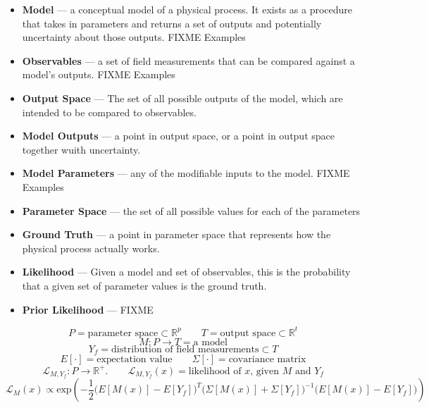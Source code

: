 \documentclass{article}
\begin{document}
\begin{itemize}

\item \textbf{Model} — a conceptual model of a physical process.  It exists as
  a procedure that takes in parameters and returns a set of
  outputs and potentially uncertainty about those outputs. FIXME Examples
 
\item \textbf{Observables} — a set of field measurements that can be compared
  against a model's outputs. FIXME Examples

\item \textbf{Output Space} — The set of all possible outputs of the model,
  which are intended to be compared to observables.

\item \textbf{Model Outputs} — a point in output space, or a point in output
  space together wuith uncertainty.

\item \textbf{Model Parameters} — any of the modifiable inputs to the
  model. FIXME Examples

\item \textbf{Parameter Space} — the set of all possible values for each of the
  parameters

\item \textbf{Ground Truth} — a point in parameter space that represents how
  the physical process actually works.

\item \textbf{Likelihood} — Given a model and set of observables, this is the
  probability that a given set of parameter values is the ground truth.

\item \textbf{Prior Likelihood} — FIXME
\end{itemize}

\newpage

\[ P = \textrm{parameter space} ⊂ ℝ^p \qquad
 T = \textrm{output space} ⊂ ℝ^t \]
\[ M: P → T  = \textrm{a model} \]
\[ Y_f = \textrm{distribution of field measurements} ⊂ T \]
\[ E[·] = \textrm{expectation value} \qquad Σ[·] = \textrm{covariance matrix} \]
\[ ℒ_{M,Y_f}: P → ℝ^+. \qquad
 ℒ_{M,Y_f}(x) = \textrm{likelihood of $x$, given $M$ and $Y_f$} \]
\[
ℒ_M(x) ∝ \textrm{exp}\left({-\frac{1}{2}\big(E[M(x)]-E[Y_f]\big)^T
     \big(Σ[M(x)]+Σ[Y_f]\big)^{-1} \big(E[M(x)]-E[Y_f]\big)}\right)
\]
\end{document}
